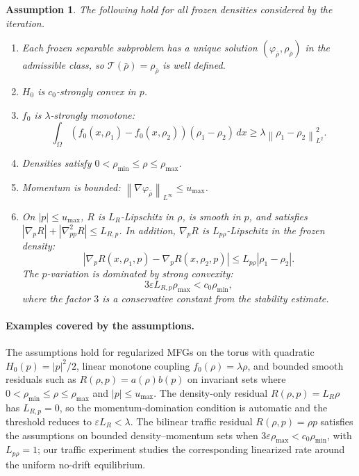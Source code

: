 \documentclass{article}
\newtheorem{assumption}{Assumption}
\newcommand{\eps}{\varepsilon}
\newcommand{\norm}[1]{\left\lVert #1 \right\rVert}
\begin{document}
\begin{assumption}
\label{ass:neurips}
The following hold for all frozen densities considered by the iteration.
\begin{enumerate}
\item Each frozen separable subproblem has a unique solution
\((\varphi_{\bar\rho},\rho_{\bar\rho})\) in the admissible class, so
\(\mathcal{T}(\bar\rho)=\rho_{\bar\rho}\) is well defined.
\item \(H_0\) is \(c_0\)-strongly convex in \(p\).
\item \(f_0\) is \(\lambda\)-strongly monotone:
\[
  \int_\Omega (f_0(x,\rho_1)-f_0(x,\rho_2))(\rho_1-\rho_2)\,dx
  \geq \lambda\norm{\rho_1-\rho_2}_{L^2}^2 .
\]
\item Densities satisfy \(0<\rho_{\min}\leq \rho\leq\rho_{\max}\).
\item Momentum is bounded: \(\norm{\nabla\varphi_{\bar\rho}}_{L^\infty}\leq u_{\max}\).
\item On \(|p|\leq u_{\max}\), \(R\) is \(L_R\)-Lipschitz in \(\rho\), is
smooth in \(p\), and satisfies
\(|\nabla_p R|+|\nabla^2_{pp}R|\leq L_{R,p}\).  In addition,
\(\nabla_pR\) is \(L_{p\rho}\)-Lipschitz in the frozen density:
\[
  |\nabla_pR(x,\rho_1,p)-\nabla_pR(x,\rho_2,p)|
  \leq L_{p\rho}|\rho_1-\rho_2|.
\]
The \(p\)-variation is dominated by strong convexity:
\[
  3\eps L_{R,p}\rho_{\max}<c_0\rho_{\min},
\]
where the factor \(3\) is a conservative constant from the stability estimate.
\end{enumerate}
\end{assumption}

\paragraph{Examples covered by the assumptions.}
The assumptions hold for regularized MFGs on the torus with quadratic
\(H_0(p)=|p|^2/2\), linear monotone coupling \(f_0(\rho)=\lambda\rho\), and
bounded smooth residuals such as \(R(\rho,p)=a(\rho)b(p)\) on invariant sets
where \(0<\rho_{\min}\leq\rho\leq\rho_{\max}\) and \(|p|\leq u_{\max}\).  The
density-only residual \(R(\rho,p)=L_R\rho\) has \(L_{R,p}=0\), so the
momentum-domination condition is automatic and the threshold reduces to
\(\eps L_R<\lambda\).  The bilinear traffic residual \(R(\rho,p)=\rho p\)
satisfies the assumptions on bounded density--momentum sets when
\(3\eps\rho_{\max}<c_0\rho_{\min}\), with \(L_{p\rho}=1\); our traffic
experiment studies the corresponding linearized rate around the uniform
no-drift equilibrium.
\end{document}
